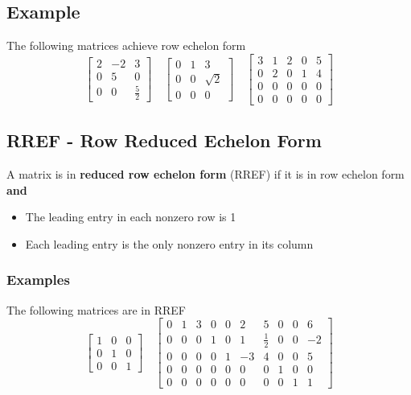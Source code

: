 \subsection{Example}
The following matrices achieve row echelon form
\[
  \begin{bmatrix}
    2 & -2 & 3 \\
    0 & 5 & 0 \\
    0 & 0 & \frac{5}{2}
  \end{bmatrix} \quad
  \begin{bmatrix}
    0 & 1 & 3 \\
    0 & 0 & \sqrt{2} \\
    0 & 0 & 0
  \end{bmatrix} \quad
  \begin{bmatrix}
    3 & 1 & 2 & 0 & 5 \\
    0 & 2 & 0 & 1 & 4 \\
    0 & 0 & 0 & 0 & 0 \\
    0 & 0 & 0 & 0 & 0
  \end{bmatrix}
\]
\subsection{RREF - Row Reduced Echelon Form}
A matrix is in \textbf{reduced row echelon form} (RREF) if it is in row echelon form \textbf{and}
\begin{itemize}
  \item The leading entry in each nonzero row is 1
  \item Each leading entry is the only nonzero entry in its column
\end{itemize}
\subsubsection{Examples}
The following matrices are in RREF
\[
  \begin{bmatrix}
    1 & 0 & 0 \\
    0 & 1 & 0 \\
    0 & 0 & 1
  \end{bmatrix} \quad
  \begin{bmatrix}
    0 & 1 & 3 & 0 & 0 & 2 & 5 & 0 & 0 & 6 \\
    0 & 0 & 0 & 1 & 0 & 1 & \frac{1}{2} & 0 & 0 & -2 \\
    0 & 0 & 0 & 0 & 1 & -3 & 4 & 0 & 0 & 5 \\
    0 & 0 & 0 & 0 & 0 & 0 & 0 & 1 & 0 & 0 \\
    0 & 0 & 0 & 0 & 0 & 0 & 0 & 0 & 1 & 1
  \end{bmatrix}
\]
